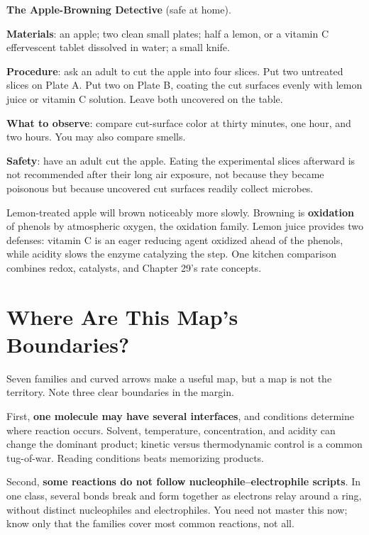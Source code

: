 \begin{shiyan}
\textbf{The Apple-Browning Detective} (safe at home).

\textbf{Materials}: an apple; two clean small plates; half a lemon, or a vitamin C effervescent tablet dissolved in water; a small knife.

\textbf{Procedure}: ask an adult to cut the apple into four slices. Put two untreated slices on Plate A. Put two on Plate B, coating the cut surfaces evenly with lemon juice or vitamin C solution. Leave both uncovered on the table.

\textbf{What to observe}: compare cut-surface color at thirty minutes, one hour, and two hours. You may also compare smells.

\textbf{Safety}: have an adult cut the apple. Eating the experimental slices afterward is not recommended after their long air exposure, not because they became poisonous but because uncovered cut surfaces readily collect microbes.

Lemon-treated apple will brown noticeably more slowly. Browning is \textbf{oxidation} of phenols by atmospheric oxygen, the oxidation family. Lemon juice provides two defenses: vitamin C is an eager reducing agent oxidized ahead of the phenols, while acidity slows the enzyme catalyzing the step. One kitchen comparison combines redox, catalysts, and Chapter 29's rate concepts.
\end{shiyan}

\section{Where Are This Map's Boundaries?}

Seven families and curved arrows make a useful map, but a map is not the territory. Note three clear boundaries in the margin.

First, \textbf{one molecule may have several interfaces}, and conditions determine where reaction occurs. Solvent, temperature, concentration, and acidity can change the dominant product; kinetic versus thermodynamic control is a common tug-of-war. Reading conditions beats memorizing products.

Second, \textbf{some reactions do not follow nucleophile--electrophile scripts}. In one class, several bonds break and form together as electrons relay around a ring, without distinct nucleophiles and electrophiles. You need not master this now; know only that the families cover most common reactions, not all.

